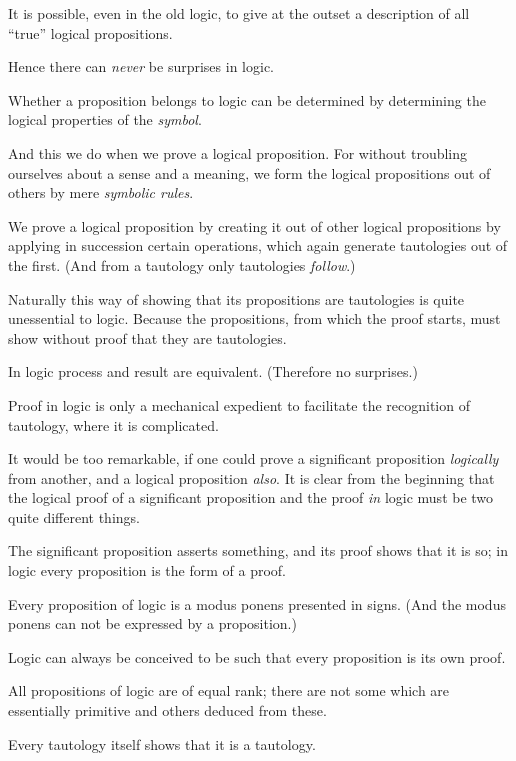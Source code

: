 {It is possible, even in the old logic, to give
at the outset a description of all ``true'' logical
propositions.}


{Hence there can \emph{never} be surprises in logic.}


{Whether a proposition belongs to logic can be
determined by determining the logical properties
of the \emph{symbol}.

And this we do when we prove a logical proposition.
For without troubling ourselves about
a sense and a meaning, we form the logical
propositions out of others by mere \emph{symbolic
rules}.

We prove a logical proposition by creating it
out of other logical propositions by applying in
succession certain operations, which again generate
tautologies out of the first. (And from a tautology
only tautologies \emph{follow}.)

Naturally this way of showing that its propositions
are tautologies is quite unessential to
logic. Because the propositions, from which the
proof starts, must show without proof that they
are tautologies.}


{In logic process and result are equivalent.
(Therefore no surprises.)}


{Proof in logic is only a mechanical expedient
to facilitate the recognition of tautology, where
it is complicated.}


{It would be too remarkable, if one could prove
a significant proposition \emph{logically} from another, and
a logical proposition \emph{also}. It is clear from the
beginning that the logical proof of a significant
proposition and the proof \emph{in} logic must be two
quite different things.}


{{\stretchyspace
The significant proposition asserts something,
and its proof shows that it is so; in logic every
proposition is the form of a proof.}

Every proposition of logic is a modus ponens
presented in signs. (And the modus ponens can
not be expressed by a proposition.)}


{Logic can always be conceived to be such that
every proposition is its own proof.}


{All propositions of logic are of equal rank;
there are not some which are essentially primitive
and others deduced from these.

Every tautology itself shows that it is a
tautology.}


